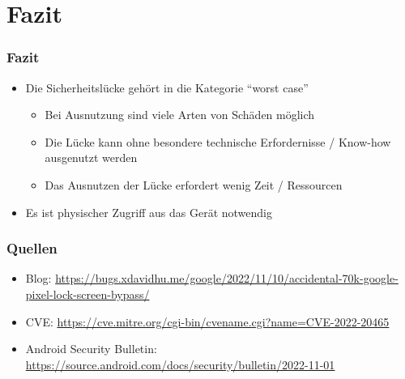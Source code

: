 \documentclass{beamer}
\begin{document}
\section{Fazit}

\begin{frame}
\frametitle{Fazit}
\begin{itemize}
    \item Die Sicherheitslücke gehört in die Kategorie ``worst case'' 
    \begin{itemize}
        \item Bei Ausnutzung sind viele Arten von Schäden möglich
        \item Die Lücke kann ohne besondere technische Erfordernisse / Know-how ausgenutzt werden
        \item Das Ausnutzen der Lücke erfordert wenig Zeit / Ressourcen
    \end{itemize}
    \item Es ist physischer Zugriff aus das Gerät notwendig
\end{itemize}
\end{frame}

\begin{frame}
\frametitle{Quellen}
\begin{itemize}
    \fontsize{8pt}{8pt}\selectfont
    \item Blog: \url{https://bugs.xdavidhu.me/google/2022/11/10/accidental-70k-google-pixel-lock-screen-bypass/}
    \item CVE: \url{https://cve.mitre.org/cgi-bin/cvename.cgi?name=CVE-2022-20465}
    \item Android Security Bulletin: \url{https://source.android.com/docs/security/bulletin/2022-11-01}
\end{itemize}
\end{frame}
\end{document}
